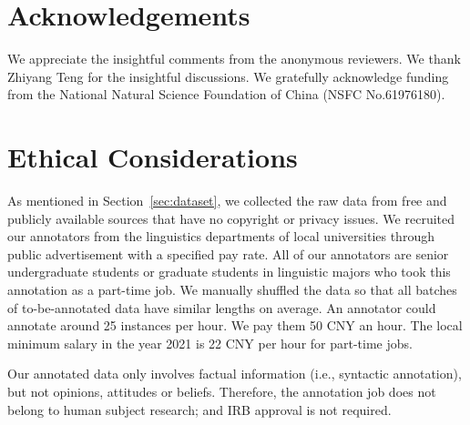 \documentclass[11pt]{article}
\begin{document}
\section*{Acknowledgements}
We appreciate the insightful comments from the anonymous reviewers.
We thank Zhiyang Teng for the insightful discussions. 
We gratefully acknowledge funding from the National Natural Science Foundation of China (NSFC No.61976180).


\section*{Ethical Considerations}

As mentioned in Section~\ref{sec:dataset}, we collected the raw data from free and publicly available sources that have no copyright or privacy issues.
We recruited our annotators from the linguistics departments of local universities through public advertisement with a specified pay rate. 
All of our annotators are senior undergraduate students or graduate students in linguistic majors who took this annotation as a part-time job. 
We manually shuffled the data so that all batches of to-be-annotated data have similar lengths on average.
An annotator could annotate around 25 instances per hour. We pay them 50 CNY an hour.
The local minimum salary in the year 2021 is 22 CNY per hour for part-time jobs.


Our annotated data only involves factual information (i.e., syntactic annotation), but not opinions, attitudes or beliefs. 
Therefore, the annotation job does not belong to human subject research; and IRB approval is not required.








\end{document}
